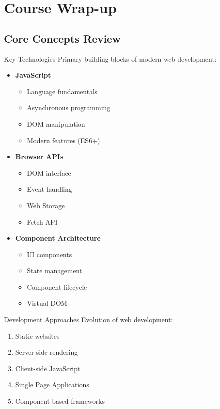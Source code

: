 \section{Course Wrap-up}

\subsection{Core Concepts Review}

\begin{concept}{Key Technologies}
    Primary building blocks of modern web development:
    \begin{itemize}
        \item \textbf{JavaScript}
            \begin{itemize}
                \item Language fundamentals
                \item Asynchronous programming
                \item DOM manipulation
                \item Modern features (ES6+)
            \end{itemize}
        \item \textbf{Browser APIs}
            \begin{itemize}
                \item DOM interface
                \item Event handling
                \item Web Storage
                \item Fetch API
            \end{itemize}
        \item \textbf{Component Architecture}
            \begin{itemize}
                \item UI components
                \item State management
                \item Component lifecycle
                \item Virtual DOM
            \end{itemize}
    \end{itemize}
\end{concept}

\begin{theorem}{Development Approaches}
    Evolution of web development:
    \begin{enumerate}
        \item Static websites
        \item Server-side rendering
        \item Client-side JavaScript
        \item Single Page Applications
        \item Component-based frameworks
    \end{enumerate}
\end{theorem}

